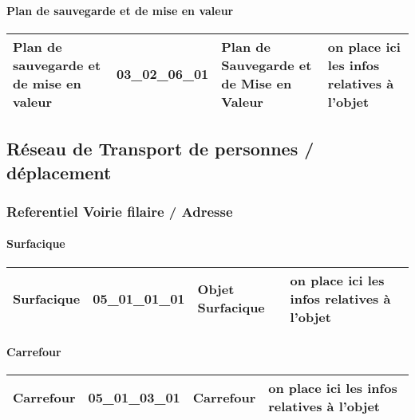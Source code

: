 \documentclass[12pt,titlepage,oneside]{book}
\begin{document}
\paragraph{Plan de sauvegarde et de mise en valeur}
\noindent
\vspace{\baselineskip}

\renewcommand{\arraystretch}{1.2}
\begin{supertabular}{|p{10cm}|c|p{13cm}|p{12cm}|}
 Plan de sauvegarde et de mise en valeur & 03\_02\_06\_01 & Plan de Sauvegarde et de Mise en Valeur & on place ici les infos relatives à l'objet\\
\hline
\end{supertabular}
\begin{figure}[h!]
  \hfill         %
\end{figure}
\subsection{Réseau de Transport de personnes / déplacement}
\subsubsection{\large Referentiel Voirie filaire / Adresse}
\paragraph{Surfacique}
\noindent
\vspace{\baselineskip}

\renewcommand{\arraystretch}{1.2}
\begin{supertabular}{|p{10cm}|c|p{13cm}|p{12cm}|}
 Surfacique & 05\_01\_01\_01 & Objet Surfacique & on place ici les infos relatives à l'objet\\
\hline
\end{supertabular}
\begin{figure}[h!]
  \hfill         %
\end{figure}


\paragraph{Carrefour}
\noindent
\vspace{\baselineskip}

\renewcommand{\arraystretch}{1.2}
\begin{supertabular}{|p{10cm}|c|p{13cm}|p{12cm}|}
 Carrefour & 05\_01\_03\_01 & Carrefour & on place ici les infos relatives à l'objet\\
\hline
\end{supertabular}
\begin{figure}[h!]
  \hfill         %
\end{figure}
\end{document}
